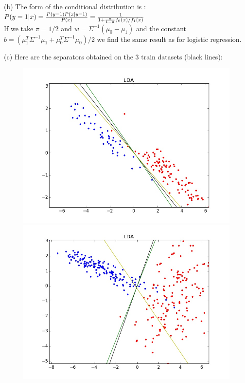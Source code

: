 \documentclass[11pt,a4paper]{article}
\begin{document}
\medskip
(b) The form of the conditional distribution is :
\\$P(y=1|x) = {P(y=1) P(x|y=1) \over P(x)} = {1 \over 1+{\pi \over 1-\pi} f_0(x)/f_1(x)}$
\\If we take $\pi = 1/2$ and $w = \Sigma^{-1} (\mu_0 - \mu_1)$ and the constant
$b = (\mu_1^{T} \Sigma^{-1} \mu_1 + \mu_0^{T} \Sigma^{-1} \mu_0)/2$ we find the same result as for logistic regression.

\medskip
(c) Here are the separators obtained on the 3 train datasets (black lines): 

\begin{figure}[H]
\centering
\noindent\includegraphics[scale=0.3]{images/LDA_A.jpeg}
\noindent\includegraphics[scale=0.3]{images/LDA_B.jpeg}

\end{figure}
\end{document}
